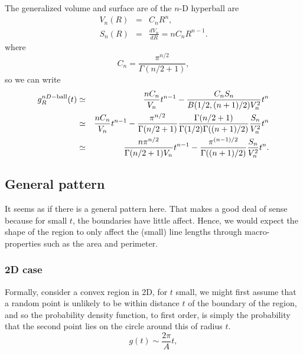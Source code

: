 \documentclass{article}
\begin{document}
The generalized volume and surface are of the $n$-D hyperball are
\begin{eqnarray}
 V_n(R) & = & C_n R^n,
  \label{eq:gen_vol} \\
 S_{n}(R) & = & \frac{dV_n}{dR} = n C_n R^{n-1}.
  \label{eq:gen_surf}
\end{eqnarray}
where
\begin{equation}
  \label{eq:cn}
   C_n = \frac{ \pi^{n/2} }{\Gamma(n/2 + 1)},
\end{equation}
so we can write
\begin{eqnarray}
  g^{nD-{\rm ball}}_R(t)
 & \simeq  & 
      \frac{n C_n}{V_n} t^{n-1}
    -  \frac{C_n S_n}{B(1/2,(n+1)/2) V_n^2} t^{n} \nonumber  \\
 & \simeq  & 
      \frac{n C_n}{V_n} t^{n-1}
    -  \frac{ \pi^{n/2} }{\Gamma(n/2 + 1)} 
       \frac{\Gamma(n/2 + 1)}{\Gamma(1/2) \Gamma((n+1)/2)}
        \frac{S_n}{ V_n^2} t^{n} \nonumber  \\
 & \simeq  & 
      \frac{n  \pi^{n/2}}{\Gamma(n/2 + 1) V_n} t^{n-1}
    -  \frac{ \pi^{(n-1)/2} }{\Gamma((n+1)/2)}
        \frac{S_n}{ V_n^2} t^{n} .
\end{eqnarray}





\subsection{General pattern}

It seems as if there is a general pattern here.  That makes a good
deal of sense because for small $t$, the boundaries have little
affect. Hence, we would expect the shape of the region to only affect
the (small) line lengths through macro-properties such as the area and
perimeter.

\subsubsection{2D case}

Formally, consider a convex region in 2D, for $t$ small, we might
first assume that a random point is unlikely to be within distance $t$
of the boundary of the region, and so the probability density
function, to first order, is simply the probability that the second
point lies on the circle around this of radius $t$.
\begin{equation}
  g(t) \sim \frac{2 \pi}{A} t, 
\end{equation}
\end{document}
